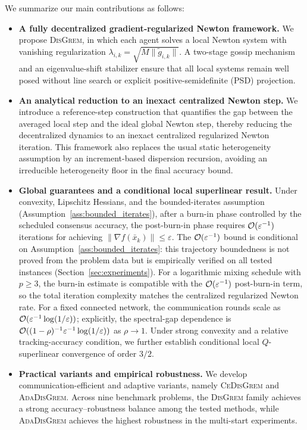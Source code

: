 \documentclass[review,onefignum,onetabnum]{siamart171218}
\begin{document}
	We summarize our main contributions as follows:
	\begin{itemize}[leftmargin=1.5em]
		\item \textbf{A fully decentralized gradient-regularized Newton framework.}
		We propose \textsc{DisGrem}, in which each agent solves a local Newton system
		with vanishing regularization $\lambda_{i,k}=\sqrt{M\|\tilde g_{i,k}\|}$.
		A two-stage gossip mechanism and an eigenvalue-shift stabilizer ensure that
		all local systems remain well posed without line search or explicit positive-semidefinite (PSD) projection.
		
		\item \textbf{An analytical reduction to an inexact centralized Newton step.}
		We introduce a reference-step construction that quantifies the gap between the
		averaged local step and the ideal global Newton step, thereby reducing the
		decentralized dynamics to an inexact centralized regularized Newton iteration.
		This framework also replaces the usual static heterogeneity assumption by an
		increment-based dispersion recursion, avoiding an irreducible
		heterogeneity floor in the final accuracy bound.
		
		\item \textbf{Global guarantees and a conditional local superlinear result.}
		Under convexity, Lipschitz Hessians, and the bounded-iterates
		assumption (Assumption~\ref{ass:bounded_iterates}),
		after a burn-in phase controlled by the scheduled consensus accuracy,
		the post-burn-in phase requires $\mathcal{O}(\varepsilon^{-1})$ iterations for
		achieving $\|\nabla f(\bar x_k)\|\le\varepsilon$.
		The $\mathcal{O}(\varepsilon^{-1})$ bound is conditional on
		Assumption~\ref{ass:bounded_iterates}: this trajectory boundedness is
		not proved from the problem data but is empirically verified on all
		tested instances (Section~\ref{sec:experiments}).
		For a logarithmic mixing schedule with $p\ge3$, the burn-in estimate
		is compatible with the $\mathcal{O}(\varepsilon^{-1})$ post-burn-in term,
		so the total iteration complexity matches the centralized regularized
		Newton rate. For a fixed connected
		network, the communication rounds scale as
		$\mathcal{O}(\varepsilon^{-1}\log(1/\varepsilon))$; explicitly, the
		spectral-gap dependence is
		$\mathcal{O}((1-\rho)^{-1}\varepsilon^{-1}\log(1/\varepsilon))$ as
		$\rho\to1$.
		Under strong convexity and a relative tracking-accuracy condition,
		we further establish conditional local $Q$-superlinear convergence
		of order $3/2$.
		
		\item \textbf{Practical variants and empirical robustness.}
		We develop communication-efficient and adaptive variants, namely
		\textsc{CeDisGrem} and \textsc{AdaDisGrem}. Across nine benchmark problems,
	the \textsc{DisGrem} family achieves a strong accuracy--robustness
	balance among the tested methods, while \textsc{AdaDisGrem} achieves the
		highest robustness in the multi-start experiments.
	\end{itemize}
	
\end{document}

